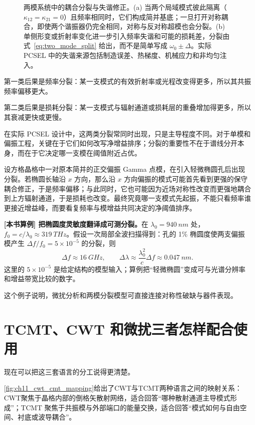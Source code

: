 \begin{figure}[htbp]
  \centering
  
  \caption{两模系统中的耦合分裂与失谐修正。(a) 当两个局域模式彼此隔离（$\kappa_{12}=\kappa_{21}=0$）且频率相同时，它们构成简并基底；一旦打开对称耦合，即使两个谐振器仍完全相同，对称与反对称超模也会分裂。(b) 单侧形变或折射率变化进一步引入频率失谐和可能的损耗差，分裂由式~\eqref{eq:two_mode_split} 给出，而不是简单写成 $\omega_0\pm\Delta$。实际 PCSEL 中的失谐来源包括制造误差、热梯度、机械应力和非均匀注入。}
  \label{fig:ch11_mode_splitting}
\end{figure}

第一类后果是频率分裂：某一支模式的有效折射率或光程改变得更多，所以其共振频率偏移更大。

第二类后果是损耗分裂：某一支模式与辐射通道或损耗层的重叠增加得更多，所以其衰减更快或更慢。

在实际 PCSEL 设计中，这两类分裂常同时出现，只是主导程度不同。对于单模和偏振工程，关键在于它们如何改写净增益排序；分裂的重要性不在于谱线分开本身，而在于它决定哪一支模在阈值附近占优。

设方格晶格中一对原本简并的正交偏振 Gamma 点模，在引入轻微椭圆孔后出现分裂。若椭圆长轴沿 $x$ 方向，那么沿 $x$ 方向偏振的模式可能首先看到更强的保守耦合修正，于是频率偏移；与此同时，它也可能因为近场对称性改变而更强地耦合到上方辐射通道，于是损耗也改变。最终究竟哪一支模式先起振，不能只看频率谁更接近增益峰，而要看复频率与模增益共同决定的净阈值排序。

\begin{ExampleBox}
\textbf{[本书算例] 把椭圆度灵敏度翻译成可测分裂。}在 $\lambda_0=\SI{940}{nm}$ 处，$f_0=c/\lambda_0\approx\SI{319}{THz}$。假设一次局部全波扫描得到：孔的 1\% 椭圆度使两支偏振模产生 $\Delta f/f_0=5\times10^{-5}$ 的分裂，则
\[
\Delta f\approx\SI{16}{GHz},\qquad
\Delta\lambda\approx\frac{\lambda_0^2}{c}\Delta f\approx\SI{0.047}{nm}.
\]
这里的 $5\times10^{-5}$ 是给定结构的模型输入；算例把“轻微椭圆”变成可与光谱分辨率和增益带宽比较的数字。
\end{ExampleBox}

这个例子说明，微扰分析和两模分裂模型可直接连接对称性破缺与器件表现。

\section{TCMT、CWT 和微扰三者怎样配合使用}
现在可以把这三套语言的分工说得更清楚。

\cref{fig:ch11_cwt_cmt_mapping}给出了CWT与TCMT两种语言之间的映射关系：CWT聚焦于晶格内部的倒格矢散射网络，适合回答“哪种散射通道主导模式形成”；TCMT 聚焦于共振模与外部端口的能量交换，适合回答“模式如何与自由空间、衬底或波导耦合”。

